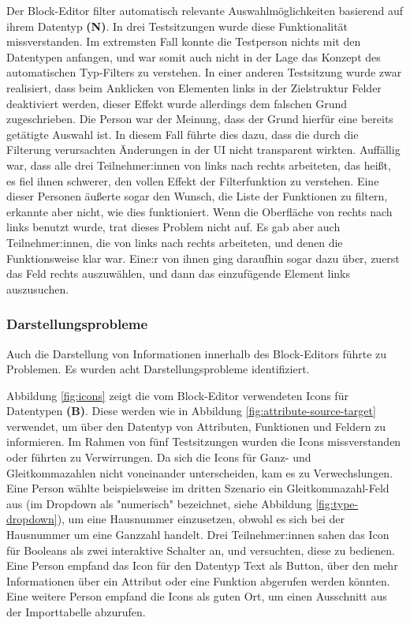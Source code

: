 Der Block-Editor filter automatisch relevante Auswahlmöglichkeiten basierend auf ihrem Datentyp \textbf{(N)}. In drei Testsitzungen wurde diese Funktionalität missverstanden. Im extremsten Fall konnte die Testperson nichts mit den Datentypen anfangen, und war somit auch nicht in der Lage das Konzept des automatischen Typ-Filters zu verstehen. In einer anderen Testsitzung wurde zwar realisiert, dass beim Anklicken von Elementen links in der Zielstruktur Felder deaktiviert werden, dieser Effekt wurde allerdings dem falschen Grund zugeschrieben. Die Person war der Meinung, dass der Grund hierfür eine bereits getätigte Auswahl ist. In diesem Fall führte dies dazu, dass die durch die Filterung verursachten Änderungen in der UI nicht transparent wirkten. Auffällig war, dass alle drei Teilnehmer:innen von links nach rechts arbeiteten, das heißt, es fiel ihnen schwerer, den vollen Effekt der Filterfunktion zu verstehen. Eine dieser Personen äußerte sogar den Wunsch, die Liste der Funktionen zu filtern, erkannte aber nicht, wie dies funktioniert. Wenn die Oberfläche von rechts nach links benutzt wurde, trat dieses Problem nicht auf. Es gab aber auch Teilnehmer:innen, die von links nach rechts arbeiteten, und denen die Funktionsweise klar war. Eine:r von ihnen ging daraufhin sogar dazu über, zuerst das Feld rechts auszuwählen, und dann das einzufügende Element links auszusuchen.

\subsubsection{Darstellungsprobleme}

Auch die Darstellung von Informationen innerhalb des Block-Editors führte zu Problemen. Es wurden acht Darstellungsprobleme identifiziert.

Abbildung \ref{fig:icons} zeigt die vom Block-Editor verwendeten Icons für Datentypen \textbf{(B)}. Diese werden wie in Abbildung \ref{fig:attribute-source-target} verwendet, um über den Datentyp von Attributen, Funktionen und Feldern zu informieren. Im Rahmen von fünf Testsitzungen wurden die Icons missverstanden oder führten zu Verwirrungen. Da sich die Icons für Ganz- und Gleitkommazahlen nicht voneinander unterscheiden, kam es zu Verwechslungen. Eine Person wählte beispielsweise im dritten Szenario ein Gleitkommazahl-Feld aus (im Dropdown als "numerisch" bezeichnet, siehe Abbildung \ref{fig:type-dropdown}), um eine Hausnummer einzusetzen, obwohl es sich bei der Hausnummer um eine Ganzzahl handelt.  Drei Teilnehmer:innen sahen das Icon für Booleans als zwei interaktive Schalter an, und versuchten, diese zu bedienen. Eine Person empfand das Icon für den Datentyp Text als Button, über den mehr Informationen über ein Attribut oder eine Funktion abgerufen werden könnten. Eine weitere Person empfand die Icons als guten Ort, um einen Ausschnitt aus der Importtabelle abzurufen.

